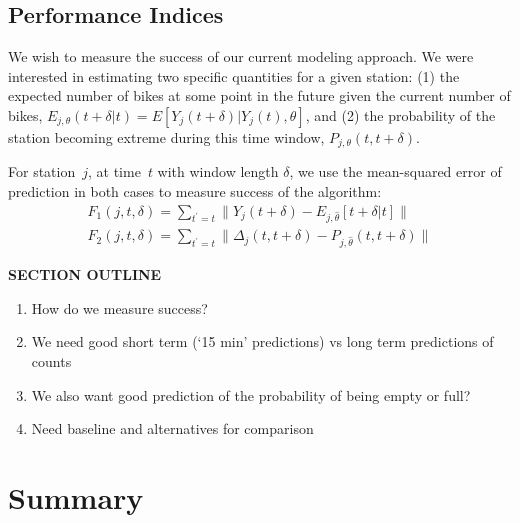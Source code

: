 \documentclass{acm_proc_article-sp}
\begin{document}
\vspace{0.5cm}

\subsection{Performance Indices}

We wish to measure the success of our current modeling approach.  We were interested in estimating two specific quantities for a given station: (1) the expected number of bikes at some point in the future given the current number of bikes, $E_{j, \theta} (t+\delta | t) = E[ Y_j(t+\delta) | Y_j(t), \theta]$, and (2) the probability of the station becoming extreme during this time window, $P_{j,\theta} (t, t+\delta)$.

For station~$j$, at time~$t$ with window length $\delta$, we use the mean-squared error of prediction in both cases to measure success of the algorithm:
\begin{align}
F_1(j, t, \delta) = \sum_{t^\prime = t} \| Y_j(t + \delta) - E_{j,\hat{\theta}} [ t+\delta | t] \| \\
F_2(j, t, \delta) = \sum_{t^\prime = t} \| \Delta_j(t,t + \delta) - P_{j,\hat{\theta}} ( t, t+\delta) \|
\end{align}

\cite{bowman:reasoning}

\vspace{0.25cm}
{\bf SECTION OUTLINE}
\begin{enumerate}
\item How do we measure success?
\item We need good short term (`15 min' predictions) vs long term predictions of counts
\item We also want good prediction of the probability of being empty or full?
\item Need baseline and alternatives for comparison
\end{enumerate}
\vspace{0.5cm}

\section{Summary}



\end{document}
